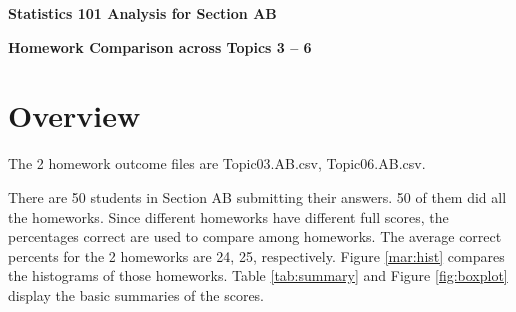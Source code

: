 \documentclass[12pt,nohyper]{tufte-handout}\usepackage[]{graphicx}\usepackage[]{color}
\begin{document}
\centerline{\Large\bf Statistics 101 Analysis for Section AB}
\centerline{\bf Homework Comparison across Topics 3 -- 6}
\centerline{\bf }


\section{Overview}

The 2 homework outcome files are Topic03.AB.csv, Topic06.AB.csv.


There are 50 students in Section AB 
submitting their answers. 50
of them did all the homeworks. Since different homeworks have different full 
scores, the percentages correct are used to compare among homeworks.
The average correct percents for the 2 homeworks are 
24, 25, respectively.
Figure \ref{mar:hist} compares the histograms of those homeworks.
Table \ref{tab:summary} and Figure \ref{fig:boxplot} display the basic summaries of the scores.
\end{document}
